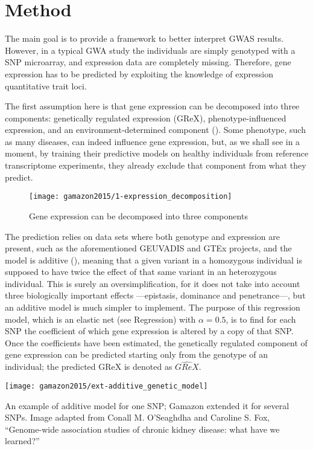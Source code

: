 \documentclass[../main.tex]{subfiles}
\begin{document}
\section{Method}

The main goal is to provide a framework to better interpret GWAS 
results. However, in a typical GWA study the individuals are simply 
genotyped with a SNP microarray, and expression data are completely 
missing. Therefore, gene expression has to be predicted by exploiting 
the knowledge of expression quantitative trait loci.

The first assumption here is that gene expression can be decomposed into 
three components: genetically regulated expression (GReX), 
phenotype-influenced expression, and an environment-determined component 
(). Some phenotype, such as many diseases, can 
indeed influence gene expression, but, as we shall see in a moment, by 
training their predictive models on healthy individuals from reference 
transcriptome experiments, they already exclude that component from what 
they predict.

\begin{figure}
	\texttt{[image: gamazon2015/1-expression\_decomposition]}
	\caption{Gene expression can be decomposed into three components}
\end{figure}

The prediction relies on data sets where both genotype and expression 
are present, such as the aforementioned GEUVADIS and GTEx projects, and 
the model is additive (), meaning that a given 
variant in a homozygous individual is supposed to have twice the effect 
of that same variant in an heterozygous individual. This is surely an 
oversimplification, for it does not take into account three biologically 
important effects ---epistasis, dominance and penetrance---, but an 
additive model is much simpler to implement. The purpose of this 
regression model, which is an elastic net (see  
Regression) with $\alpha = 0.5$, is to find for each SNP the coefficient 
of which gene expression is altered by a copy of that SNP. Once the 
coefficients have been estimated, the genetically regulated component of 
gene expression can be predicted starting only from the genotype of an 
individual; the predicted GReX is denoted as $\hat{GReX}$.

\begin{marginfigure}{-1cm}
	\texttt{[image: gamazon2015/ext-additive\_genetic\_model]}
	\caption{An example of additive model for one SNP; Gamazon \etal 
extended it for several SNPs. Image adapted from Conall M. O'Seaghdha 
and Caroline S. Fox, \enquote{Genome-wide association studies of chronic 
kidney disease: what have we learned?}}
\end{marginfigure}
\end{document}
